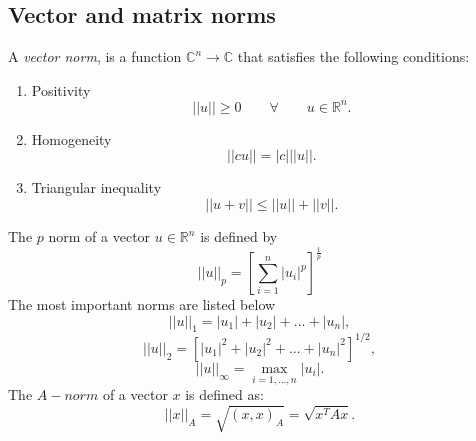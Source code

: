 \documentclass[12pt]{report}
\begin{document}
\subsection{Vector and matrix norms}
A \emph{vector norm}, is a function $\mathbb{C}^n \to \mathbb{C}$ that satisfies the following
conditions:
\begin{enumerate}
 \item Positivity
 \begin{equation*}
  ||u|| \geq 0 \qquad \forall \qquad u\in \mathbb{R}^n.
 \end{equation*}
\item Homogeneity 
 \begin{equation*}
  ||cu||=|c|||u||.
 \end{equation*}
 \item Triangular inequality
  \begin{equation*}
  ||u+v|| \leq ||u|| +||v||.
 \end{equation*}
\end{enumerate}
The $p$ norm of a vector $u\in \mathbb{R}^n$ is defined by
 \begin{equation*}
  ||u||_p=\left[ \sum_{i=1}^n|u_i|^p\right]^{\frac{1}{p}}
 \end{equation*}
 The most important norms are listed below
$$||u||_1=|u_1|+|u_2|+...+|u_n|,$$
$$||u||_2=\left[|u_1|^2+|u_2|^2+...+|u_n|^2\right]^{1/2},$$
$$||u||_{\infty}=\max_{i=1,...,n}|u_i|.$$
The $A-norm$ of a vector $x$ is defined as:
\begin{equation} \label{Anorm}
 ||x||_A= \sqrt{(x,x)_A}=\sqrt{x^TAx}.
\end{equation}
\end{document}
